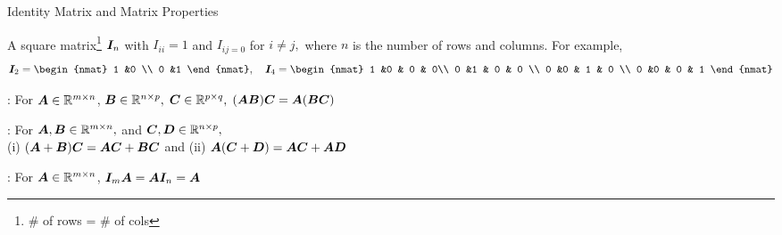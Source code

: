 \documentclass[handout,fleqn,aspectratio=169]{beamer}
\begin{document}
\begin{frame}{Identity Matrix and Matrix Properties}

\plitemsep 0.1in

\bci 
\item A square matrix\footnote{\# of rows = \# of cols} $\bm{I}_n$ with $I_{ii} = 1$ and $I_{ij=0}$ for $i \neq j,$ where $n$ is the number of rows and columns. For example, 
$$
\mat{I}_2 = 
\begin{nmat} 
 1 &0 \\
 0  &1
\end{nmat}
, \quad 
\mat{I}_4 = 
\begin{nmat} 
 1 &0 & 0 & 0\\
 0  &1 & 0 & 0 \\
 0  &0 & 1 & 0 \\
 0  &0 & 0 & 1
\end{nmat}
$$

\bigskip
\item {}: For $\bm{A} \in {\mathbb R}^{m \times n}$, $\bm{B} \in {\mathbb R}^{n \times p},$ $\bm{C} \in {\mathbb R}^{p \times q},$ $(\bm{AB})\bm{C} = \bm{A}(\bm{BC})$

\item {}: For $\bm{A}, \bm{B} \in {\mathbb R}^{m \times n},$ and $\bm{C}, \bm{D} \in {\mathbb R}^{n \times p},$\\ \hspace{2.2cm}(i) $(\bm{A} + \bm{B})\bm{C} = \bm{AC} + \bm{BC}$ and (ii) $\bm{A}(\bm{C} + \bm{D}) = \bm{AC} + \bm{AD}$

\item {}: For $\bm{A} \in {\mathbb R}^{m \times n}$, $\bm{I}_m \bm{A} = \bm{A} \bm{I}_n = \bm{A}$

\eci
\end{frame}
\end{document}
